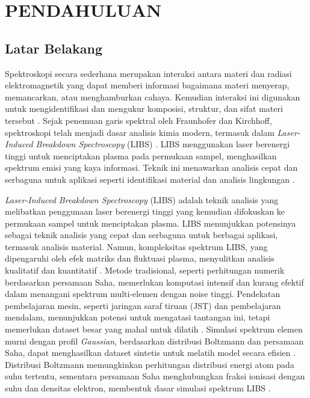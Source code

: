 \chapter{PENDAHULUAN}




\section{Latar Belakang}


\par  Spektroskopi secara sederhana merupakan  interaksi antara materi dan radiasi elektromagnetik yang dapat memberi informasi bagaimana materi menyerap, memancarkan, atau menghamburkan cahaya. Kemudian interaksi ini  digunakan untuk mengidentifikasi dan mengukur komposisi, struktur, dan sifat materi tersebut \parencite{hollas2013}.  
Sejak penemuan garis spektral oleh Fraunhofer dan Kirchhoff, spektroskopi telah menjadi dasar analisis kimia modern, termasuk dalam \textit{Laser-Induced Breakdown Spectroscopy} (LIBS) \parencite{thorne1999}. LIBS menggunakan laser berenergi tinggi untuk menciptakan plasma pada permukaan sampel, menghasilkan spektrum emisi yang kaya informasi. Teknik ini menawarkan analisis cepat dan serbaguna untuk aplikasi seperti identifikasi material dan analisis lingkungan \parencite{thorne1999}.

\par \textit{Laser-Induced Breakdown Spectroscopy} (LIBS) adalah teknik analisis yang melibatkan penggunaan laser berenergi tinggi yang kemudian difokuskan ke permukaan sampel untuk menciptakan plasma. LIBS menunjukkan potensinya sebagai teknik analisis yang cepat dan serbaguna untuk berbagai aplikasi, termasuk analisis material. Namun, kompleksitas spektrum LIBS, yang dipengaruhi oleh efek matriks dan fluktuasi plasma, menyulitkan analisis kualitatif dan kuantitatif \parencite{gasior2023analysis}. Metode tradisional, seperti perhitungan numerik berdasarkan persamaan Saha, memerlukan komputasi intensif dan kurang efektif dalam menangani spektrum multi-elemen dengan noise tinggi. Pendekatan pembelajaran mesin, seperti jaringan saraf tiruan (JST) dan pembelajaran mendalam, menunjukkan potensi untuk mengatasi tantangan ini, tetapi memerlukan dataset besar yang mahal untuk dilatih \parencite{gasior2023analysis}. Simulasi spektrum elemen murni dengan profil \textit{Gaussian}, berdasarkan distribusi Boltzmann dan persamaan Saha, dapat menghasilkan dataset sintetis untuk melatih model secara efisien \parencite{pan-2024}. Distribusi Boltzmann memungkinkan perhitungan distribusi energi atom pada suhu tertentu, sementara persamaan Saha menghubungkan fraksi ionisasi dengan suhu dan densitas elektron, membentuk dasar simulasi spektrum LIBS \parencite{thorne1999}.

